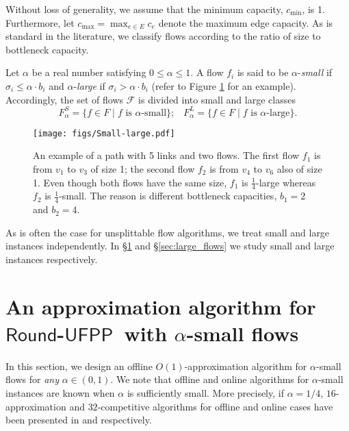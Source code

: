 \documentclass[a4paper,UKenglish]{lipics-v2016}
\newcommand{\rufpp}{\mbox{$\mathsf{Round}$-$\mathsf{UFPP}$}}
\theoremstyle{plain}
\newcommand{\Flarge}{F^L}
\newcommand{\Fsmall}{F^S}
\begin{document}
Without loss of generality, we assume that the minimum capacity, $c_{\min}$, is 1. Furthermore, let $c_{\max}=\max_{e\in E} c_e$ denote the maximum edge capacity. As is standard in the literature, we classify flows according to the ratio of size to bottleneck capacity.

\begin{definition}
\noindent Let $\alpha$ be a real number satisfying $0\leq \alpha \leq 1$. A flow $f_i$ is said to be  $\alpha$-{\em small} if $\sigma_i \leq \alpha\cdot b_i$ and $\alpha$-{\em large} if $\sigma_i > \alpha\cdot b_i$ (refer to Figure \ref{fig:Small_large} for an example). Accordingly, the set of flows $\mathcal{F}$ is divided into small and large classes
\begin{equation*} 
\Fsmall_{\alpha}=\{f \in F \mid f \mbox{ is } \alpha\mbox{-small} \};\;\;\;
\Flarge_{\alpha}=\{f \in F \mid f \mbox{ is } \alpha\mbox{-large} \}.
\end{equation*}
\end{definition}

\begin{figure}[htb]
\begin{center}
\texttt{[image: figs/Small-large.pdf]}
\caption{An example of a path with 5 links and two flows. The first flow $f_1$ is from $v_1$ to $v_3$ of size 1; the second flow $f_2$ is from $v_4$ to $v_6$ also of size 1. Even though both flows have the same size, $f_1$ is $\frac{1}{4}$-large whereas $f_2$ is $\frac{1}{4}$-small. The reason is different bottleneck capacities, $b_1=2$ and $b_2=4$.
\label{fig:Small_large}}
\end{center}
\end{figure}


As is often the case for unsplittable flow algorithms, we treat small and large instances independently. In \S\ref{sec:small_flows} and \S\ref{sec:large_flows} we study small and large instances respectively.

\section{An approximation algorithm for \rufpp\ with $\alpha$-small flows}\label{sec:small_flows}
In this section, we design an offline $O(1)$-approximation algorithm for $\alpha$-small flows for {\em any} $\alpha \in (0,1)$.  We note that offline and online algorithms for $\alpha$-small instances are known when $\alpha$ is sufficiently small. More precisely, if $\alpha = 1/4$, $16$-approximation and $32$-competitive algorithms for offline and online cases have been presented in \cite{Elbassioni} and \cite{epstein} respectively. 
\end{document}
